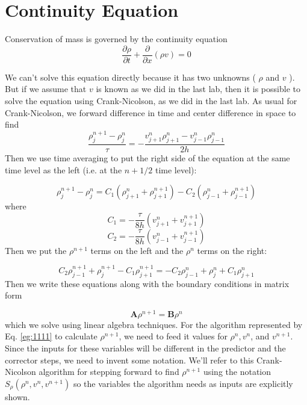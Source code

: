\documentclass{book}
\theoremstyle{plain}
\theoremstyle{definition}
\numberwithin{exm}{chapter}
\theoremstyle{remark}
\theoremstyle{summary}
\theoremstyle{overview}
\begin{document}
\section*{Continuity Equation}
Conservation of mass is governed by the continuity equation
\begin{equation}\label{eq:1105}
\frac{\partial \rho}{\partial t}+\frac{\partial}{\partial x}(\rho v)=0
\end{equation}

We can\rq t solve this equation directly because it has two unknowns ( $\rho$ and $v$ ). But if we assume that $v$ is known as we did in the last lab, then it is possible to solve the equation using Crank-Nicolson, as we did in the last lab. As usual for Crank-Nicolson, we forward difference in time and center difference in space to find
\begin{equation}\label{eq:1106}
\frac{\rho_{j}^{n+1}-\rho_{j}^{n}}{\tau}=-\frac{v_{j+1}^{n} \rho_{j+1}^{n}-v_{j-1}^{n} \rho_{j-1}^{n}}{2 h}
\end{equation}
Then we use time averaging to put the right side of the equation at the same time level as the left (i.e. at the $n+1 / 2$ time level):

\begin{equation}\label{eq:1107}
\rho_{j}^{n+1}-\rho_{j}^{n}=C_{1}\left(\rho_{j+1}^{n}+\rho_{j+1}^{n+1}\right)-C_{2}\left(\rho_{j-1}^{n}+\rho_{j-1}^{n+1}\right)
\end{equation}
where
\begin{equation}\label{eq:1108}
C_{1}=-\frac{\tau}{8 h}\left(v_{j+1}^{n}+v_{j+1}^{n+1}\right)
\end{equation}
\begin{equation}\label{eq:1109}
C_{2}=-\frac{\tau}{8 h}\left(v_{j-1}^{n}+v_{j-1}^{n+1}\right)
\end{equation}
 Then we put the  $\rho^{n+1}$  terms on the left and the $\rho^{n}$ terms on the right: 

\begin{equation}\label{eq:1110}
C_{2} \rho_{j-1}^{n+1}+\rho_{j}^{n+1}-C_{1} \rho_{j+1}^{n+1}=-C_{2} \rho_{j-1}^{n}+\rho_{j}^{n}+C_{1} \rho_{j+1}^{n}
\end{equation}
Then we write these equations along with the boundary conditions in matrix form

\begin{equation}\label{eq:1111}
\mathbf{A} \rho^{n+1}=\mathbf{B} \rho^{n}
\end{equation}
which we solve using linear algebra techniques. For the algorithm represented by Eq. \eqref{eg:1111} to calculate $\rho^{n+1}$, we need to feed it values for $\rho^{n}, v^{n}$, and $v^{n+1}$. Since the inputs for these variables will be different in the predictor and the corrector steps, we need to invent some notation. We\rq ll refer to this Crank-Nicolson algorithm for stepping forward to find $\rho^{n+1}$ using the notation $S_{\rho}\left(\rho^{n}, v^{n}, v^{n+1}\right)$ so the variables the algorithm needs as inputs are explicitly shown.
\end{document}

